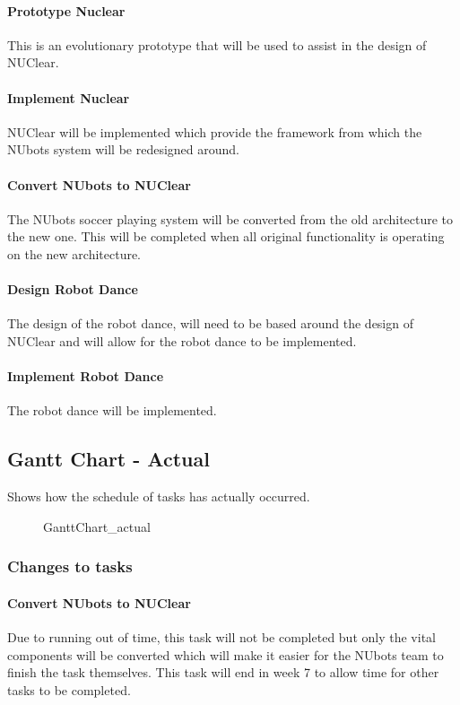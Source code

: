 \documentclass[a4paper]{article}
\begin{document}
				\paragraph{Prototype Nuclear}
					This is an evolutionary prototype that will be used to assist in the design of NUClear.
				\paragraph{Implement Nuclear}
					NUClear will be implemented which provide the framework from which the NUbots system will be redesigned around.
				\paragraph{Convert NUbots to NUClear}
					The NUbots soccer playing system will be converted from the old architecture to the new one. This will be completed when all original functionality is operating on the new architecture.
				\paragraph{Design Robot Dance}
					The design of the robot dance, will need to be based around the design of NUClear and will allow for the robot dance to be implemented.
				\paragraph{Implement Robot Dance}
					The robot dance will be implemented.
\newpage
		\subsection{Gantt Chart - Actual}
			Shows how the schedule of tasks has actually occurred. \\
			\begin{figure}[!ht]
				{GanttChart_actual}
			\end{figure}
			\subsubsection{Changes to tasks}
				\paragraph{Convert NUbots to NUClear}
					Due to running out of time, this task will not be completed but only the vital components will be converted which will make it easier for the NUbots team to finish the task themselves. This task will end in week 7 to allow time for other tasks to be completed.
\end{document}
